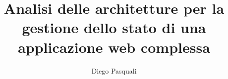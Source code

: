 \documentclass{report}
\author{Diego Pasquali}
\title{Analisi delle architetture per la gestione dello stato di una applicazione web complessa}
\begin{document}
    \maketitle
    \pagebreak

    
\end{document}
